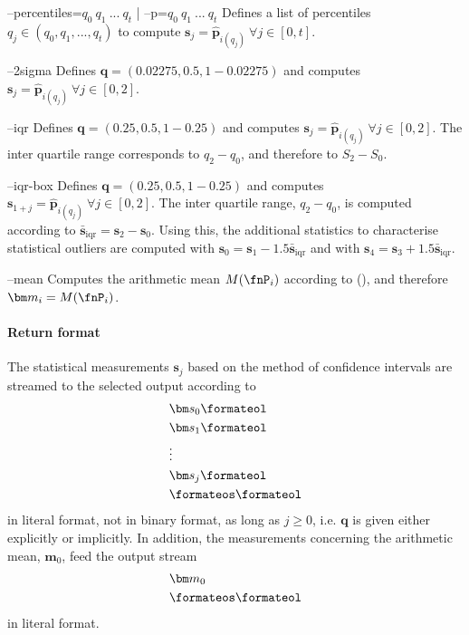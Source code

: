 
\procargout

\begin{procarg}{--percentiles=$q_0\ q_1\ ...\ q_t$ | --p=$q_0\ q_1\ ...\ q_t$}
  Defines a list of percentiles $q_j \in (q_0, q_1, ..., q_t)$ to compute $\bm s_j = \widehat{\bm p}_{i(q_j)}\ \forall j \in [0,t]$.
\end{procarg}

\begin{procarg}{--2sigma}
  Defines $\bm q = (\num{0.02275}, \num{0.5}, 1 - \num{0.02275})$ and computes $\bm s_j = \widehat{\bm p}_{i(q_j)}\ \forall j \in [0,2]$.
\end{procarg}

\begin{procarg}{--iqr}
  Defines $\bm q = (\num{0.25}, {0.5}, 1 - \num{0.25})$ and computes $\bm s_j = \widehat{\bm p}_{i(q_j)}\ \forall j \in [0,2]$. The inter quartile range corresponds to $q_2 - q_0$, and therefore to $S_2 - S_0$.
\end{procarg}

\begin{procarg}{--iqr-box}
  Defines $\bm q = (\num{0.25}, {0.5}, 1 - \num{0.25})$ and computes $\bm s_{1+j} = \widehat{\bm p}_{i(q_j)}\ \forall j \in [0,2]$. The inter quartile range, $q_2 - q_0$, is computed according to ${\bar{\bm s}}_{\text{iqr}} = \bm s_2 - \bm s_0$. Using this, the additional statistics to characterise statistical outliers are computed with $\bm s_0 = \bm s_1 - \num{1.5} {\bar{\bm s}}_{\text{iqr}}$ and with $\bm s_4 = \bm s_3 + \num{1.5} {\bar{\bm s}}_{\text{iqr}}$.
\end{procarg}

\begin{procarg}{--mean}
  Computes the arithmetic mean $M(\fnP_i)$ according to (), and therefore $\bm m_{i} = M(\fnP_i)$.
\end{procarg}

\procargsilent
\clearpage
\paragraph{Return format}

The statistical measurements $\bm s_j$ based on the method of confidence intervals are streamed to the selected output according to
\begin{align*}
  &\bm s_0\formateol\\
  &\bm s_1\formateol\\
  &\vdots \\
  &\bm s_j\formateol\\
  &\formateos\formateol
\end{align*}
in literal format, not in binary format, as long as $j \geq 0$, i.e. $\bm q$ is given either explicitly or implicitly. In addition, the measurements concerning the  arithmetic mean, $\bm m_0$, feed the output stream
\begin{align*}
  &\bm m_0\\
  &\formateos\formateol
\end{align*}
in literal format.
